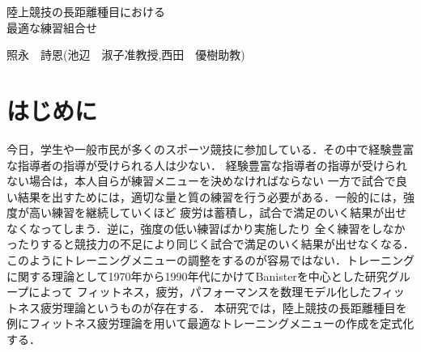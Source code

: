 \documentclass[12pt]{jarticle}
\begin{document}
\begin{center}
  \LARGE{陸上競技の長距離種目における\\最適な練習組合せ}
\end{center}
\begin{flushright}
  照永　詩恩(池辺　淑子准教授,西田　優樹助教)
\end{flushright}
\section{はじめに}
今日，学生や一般市民が多くのスポーツ競技に参加している．その中で経験豊富な指導者の指導が受けられる人は少ない．
経験豊富な指導者の指導が受けられない場合は，本人自らが練習メニューを決めなければならない
一方で試合で良い結果を出すためには，適切な量と質の練習を行う必要がある．一般的には，強度が高い練習を継続していくほど
疲労は蓄積し，試合で満足のいく結果が出せなくなってしまう．逆に，強度の低い練習ばかり実施したり
全く練習をしなかったりすると競技力の不足により同じく試合で満足のいく結果が出せなくなる．
このようにトレーニングメニューの調整をするのが容易ではない．トレーニングに関する理論として1970年から1990年代にかけてBanisterを中心とした研究グループによって
フィットネス，疲労，パフォーマンスを数理モデル化したフィットネス疲労理論というものが存在する\cite{bani}．
本研究では，陸上競技の長距離種目を例にフィットネス疲労理論\cite{bani}を用いて最適なトレーニングメニューの作成を定式化する．
\end{document}
